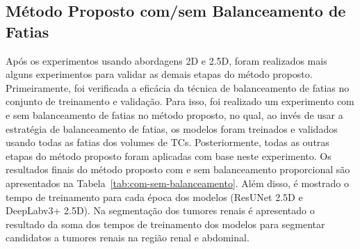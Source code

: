 \subsection{Método Proposto com/sem Balanceamento de Fatias}
\label{sec:com-sem-balanceamento-fatias}

Após os experimentos usando abordagens 2D e 2.5D, foram realizados mais alguns experimentos para validar as demais etapas do método proposto. Primeiramente, foi verificada a eficácia da técnica de balanceamento de fatias no conjunto de treinamento e validação. Para isso, foi realizado um experimento com e sem balanceamento de fatias no método proposto, no qual, ao invés de usar a estratégia de balanceamento de fatias, os modelos foram treinados e validados usando todas as fatias dos volumes de TCs. Posteriormente, todas as outras etapas do método proposto foram aplicadas com base neste experimento. Os resultados finais do método proposto com e sem balanceamento proporcional são apresentados na Tabela~\ref{tab:com-sem-balanceamento}. Além disso, é mostrado o tempo de treinamento para cada época dos modelos (ResUNet 2.5D e DeepLabv3+ 2.5D). Na segmentação dos tumores renais é apresentado o resultado da soma dos tempos de treinamento dos modelos para segmentar candidatos a tumores renais na região renal e abdominal.

